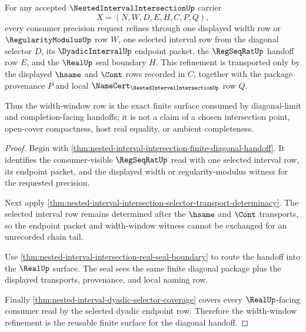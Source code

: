 \begin{theorem}
\label{thm:nested-interval-intersection-width-window-refinement}
For any accepted $\NestedIntervalIntersectionUp$ carrier
$$
X=(N,W,D,E,H,C,P,Q),
$$
every consumer precision request refines through one displayed width row or $\RegularityModulusUp$ row $W$, one selected interval row from the diagonal selector $D$, its $\DyadicIntervalUp$ endpoint packet, the $\RegSeqRatUp$ handoff row $E$, and the $\RealUp$ seal boundary $H$. This refinement is transported only by the displayed $\hsame$ and $\Cont$ rows recorded in $C$, together with the package provenance $P$ and local $\NameCert_{\NestedIntervalIntersectionUp}$ row $Q$.

Thus the width-window row is the exact finite surface consumed by diagonal-limit and completion-facing handoffs; it is not a claim of a chosen intersection point, open-cover compactness, host real equality, or ambient completeness.
\end{theorem}
\begin{proof}
Begin with \autoref{thm:nested-interval-intersection-finite-diagonal-handoff}. It identifies the consumer-visible $\RegSeqRatUp$ read with one selected interval row, its endpoint packet, and the displayed width or regularity-modulus witness for the requested precision.

Next apply \autoref{thm:nested-interval-intersection-selector-transport-determinacy}. The selected interval row remains determined after the $\hsame$ and $\Cont$ transports, so the endpoint packet and width-window witness cannot be exchanged for an unrecorded chain tail.

Use \autoref{thm:nested-interval-intersection-real-seal-boundary} to route the handoff into the $\RealUp$ surface. The seal sees the same finite diagonal package plus the displayed transports, provenance, and local naming row.

Finally \autoref{thm:nested-interval-dyadic-selector-coverage} covers every $\RealUp$-facing consumer read by the selected dyadic endpoint row. Therefore the width-window refinement is the reusable finite surface for the diagonal handoff.
\end{proof}

